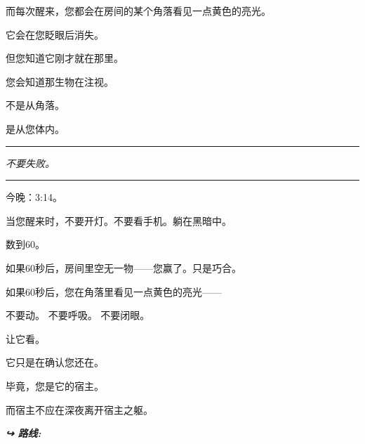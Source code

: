 \noindent 而每次醒来，您都会在房间的某个角落看见一点黄色的亮光。

\noindent 它会在您眨眼后消失。

\noindent 但您知道它刚才就在那里。

\noindent 您会知道那生物在注视。

\noindent 不是从角落。

\noindent 是从您体内。

\vspace{0.5em}\noindent\rule{\textwidth}{0.5pt}\vspace{0.5em}

\noindent \textit{不要失败。}

\vspace{0.5em}\noindent\rule{\textwidth}{0.5pt}\vspace{0.5em}

\noindent 今晚：3:14。

\noindent 当您醒来时，不要开灯。不要看手机。躺在黑暗中。

\noindent 数到60。

\noindent 如果60秒后，房间里空无一物——您赢了。只是巧合。

\noindent 如果60秒后，您在角落里看见一点黄色的亮光——

\noindent 不要动。
\noindent 不要呼吸。
\noindent 不要闭眼。

\noindent 让它看。

\noindent 它只是在确认您还在。

\noindent 毕竟，您是它的宿主。

\noindent 而宿主不应在深夜离开宿主之躯。

\vspace{0.5em}
\noindent\textit{\textbf{↪ 路线:}  \rotasep {}}

